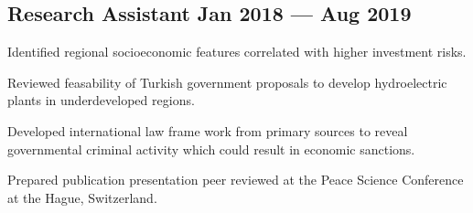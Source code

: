 \documentclass[%
               doublesided,
               paper=a4,
               fontsize=10.5pt
              ]{my-resume}
\begin{document}
{    \subsection{{Research Assistant \hfill Jan 2018 --- Aug 2019}}
    \begin{zitemize}
        \footnotesize
        \item{Identified regional socioeconomic features correlated with higher investment risks.}
        \item{Reviewed feasability of Turkish government proposals to develop hydroelectric plants in underdeveloped regions.}
        \item{Developed international law frame work from primary sources to reveal governmental criminal activity which could result in economic sanctions.}
        \item{Prepared publication presentation peer reviewed at the Peace Science Conference at the Hague, Switzerland.}
        
        
    \end{zitemize}

}
\end{document}
